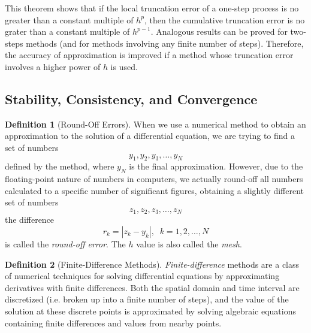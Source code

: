 \documentclass{article}
\theoremstyle{remark}
\theoremstyle{definition}
\newtheorem{definition}{Definition}[section]
\begin{document}
This theorem shows that if the local truncation error of a one-step process is no greater than a constant multiple of $h^p$, then the cumulative truncation error is no grater than a constant multiple of $h^{p-1}$. Analogous results can be proved for two-steps methods (and for methods involving any finite number of steps). Therefore, the accuracy of approximation is improved if a method whose truncation error involves a higher power of $h$ is used. 

\subsection{Stability, Consistency, and Convergence}

\begin{definition}[Round-Off Errors]
When we use a numerical method to obtain an approximation to the solution of a differential equation, we are trying to find a set of numbers 
\[y_1, y_2, y_3, \ldots, y_N\]
defined by the method, where $y_N$ is the final approximation. However, due to the floating-point nature of numbers in computers, we actually round-off all numbers calculated to a specific number of significant figures, obtaining a slightly different set of numbers
\[z_1, z_2, z_3, \ldots, z_N\]
the difference
\[r_k = |z_k - y_k|, \;\; k = 1, 2, \ldots, N\]
is called the \textit{round-off error}. The $h$ value is also called the \textit{mesh}. 
\end{definition}

\begin{definition}[Finite-Difference Methods]
\textit{Finite-difference} methods are a class of numerical techniques for solving differential equations by approximating derivatives with finite differences. Both the spatial domain and time interval are discretized (i.e. broken up into a finite number of steps), and the value of the solution at these discrete points is approximated by solving algebraic equations containing finite differences and values from nearby points. 
\end{definition}
\end{document}
